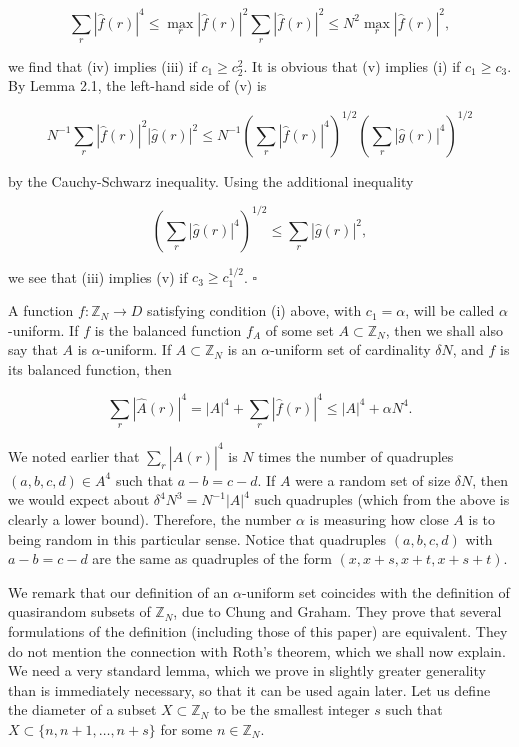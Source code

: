 \documentclass[10pt]{article}
\begin{document}
$$
\sum_{r}|\hat{f}(r)|^{4} \leqslant \max _{r}|\hat{f}(r)|^{2} \sum_{r}|\hat{f}(r)|^{2} \leqslant N^{2} \max _{r}|\hat{f}(r)|^{2},
$$

we find that (iv) implies (iii) if $c_{1} \geqslant c_{2}^{2}$. It is obvious that (v) implies (i) if $c_{1} \geqslant c_{3}$. By Lemma 2.1, the left-hand side of (v) is

$$
N^{-1} \sum_{r}|\hat{f}(r)|^{2}|\hat{g}(r)|^{2} \leqslant N^{-1}\left(\sum_{r}|\hat{f}(r)|^{4}\right)^{1 / 2}\left(\sum_{r}|\hat{g}(r)|^{4}\right)^{1 / 2}
$$

by the Cauchy-Schwarz inequality. Using the additional inequality

$$
\left(\sum_{r}|\hat{g}(r)|^{4}\right)^{1 / 2} \leqslant \sum_{r}|\hat{g}(r)|^{2},
$$

we see that (iii) implies (v) if $c_{3} \geqslant c_{1}^{1 / 2}$. \(\square\)

A function $f: \mathbb{Z}_{N} \rightarrow D$ satisfying condition (i) above, with $c_{1}=\alpha$, will be called $\alpha$-uniform. If $f$ is the balanced function $f_{A}$ of some set $A \subset \mathbb{Z}_{N}$, then we shall also say that $A$ is $\alpha$-uniform. If $A \subset \mathbb{Z}_{N}$ is an $\alpha$-uniform set of cardinality $\delta N$, and $f$ is its balanced function, then

$$
\sum_{r}|\hat{A}(r)|^{4}=|A|^{4}+\sum_{r}|\hat{f}(r)|^{4} \leqslant|A|^{4}+\alpha N^{4} .
$$

We noted earlier that $\sum_{r}|\hat{A}(r)|^{4}$ is $N$ times the number of quadruples $(a, b, c, d) \in A^{4}$ such that $a-b=c-d$. If $A$ were a random set of size $\delta N$, then we would expect about $\delta^{4} N^{3}=N^{-1}|A|^{4}$ such quadruples (which from the above is clearly a lower bound). Therefore, the number $\alpha$ is measuring how close $A$ is to being random in this particular sense. Notice that quadruples $(a, b, c, d)$ with $a-b=c-d$ are the same as quadruples of the form $(x, x+s, x+t, x+s+t)$.

We remark that our definition of an $\alpha$-uniform set coincides with the definition of quasirandom subsets of $\mathbb{Z}_{N}$, due to Chung and Graham. They prove that several formulations of the definition (including those of this paper) are equivalent. They do not mention the connection with Roth's theorem, which we shall now explain. We need a very standard lemma, which we prove in slightly greater generality than is immediately necessary, so that it can be used again later. Let us define the diameter of a subset $X \subset \mathbb{Z}_{N}$ to be the smallest integer $s$ such that $X \subset\{n, n+1, \ldots, n+s\}$ for some $n \in \mathbb{Z}_{N}$.
\end{document}
